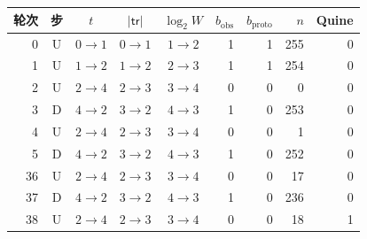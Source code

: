 \begin{tabular}{r c c c c r r r r}%
\hline%
\textbf{轮次}&\textbf{步}&\textbf{$t$}&\textbf{$|\mathsf{tr}|$}&\textbf{$\log_2 W$}&\textbf{$b_{\mathrm{obs}}$}&\textbf{$b_{\mathrm{proto}}$}&\textbf{$n$}&\textbf{Quine}\\%
\hline%
0&U&$0\to 1$&$0\to 1$&$1\to 2$&1&1&255&0\\%
1&U&$1\to 2$&$1\to 2$&$2\to 3$&1&1&254&0\\%
2&U&$2\to 4$&$2\to 3$&$3\to 4$&0&0&0&0\\%
3&D&$4\to 2$&$3\to 2$&$4\to 3$&1&0&253&0\\%
4&U&$2\to 4$&$2\to 3$&$3\to 4$&0&0&1&0\\%
5&D&$4\to 2$&$3\to 2$&$4\to 3$&1&0&252&0\\%
36&U&$2\to 4$&$2\to 3$&$3\to 4$&0&0&17&0\\%
37&D&$4\to 2$&$3\to 2$&$4\to 3$&1&0&236&0\\%
38&U&$2\to 4$&$2\to 3$&$3\to 4$&0&0&18&1\\%
\hline%
\end{tabular}
